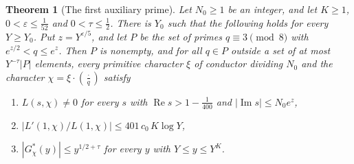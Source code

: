 \documentclass[11pt,letterpaper]{article}
\newtheorem{theorem}{Theorem}[section]
\numberwithin{equation}{section}
\begin{document}
\begin{theorem}[The first auxiliary prime]\label{stage1}
Let $N_0\ge1$ be an integer, and let $K\ge1$, $0<\varepsilon\le\tfrac1{52}$ and $0<\tau\le\tfrac12$. There is $Y_0$ such that the following holds for every $Y\ge Y_0$. Put $z=Y^{\varepsilon/5}$, and let $P$ be the set of primes $q\equiv3\pmod8$ with $e^{z/2}<q\le e^z$. Then $P$ is nonempty, and for all $q\in P$ outside a set of at most $Y^{-\tau}|P|$ elements, every primitive character $\xi$ of conductor dividing $N_0$ and the character $\chi=\xi\cdot(\tfrac{\cdot}{q})$ satisfy
\begin{enumerate}
\item[(i)] $L(s,\chi)\ne0$ for every $s$ with $\operatorname{Re}s>1-\tfrac1{400}$ and $|\operatorname{Im}s|\le N_0e^z$,
\item[(ii)] $|L'(1,\chi)/L(1,\chi)|\le401\,c_0\,K\log Y$,
\item[(iii)] $|G^\ast_\chi(y)|\le y^{1/2+\tau}$ for every $y$ with $Y\le y\le Y^K$.
\end{enumerate}
\end{theorem}
\end{document}
